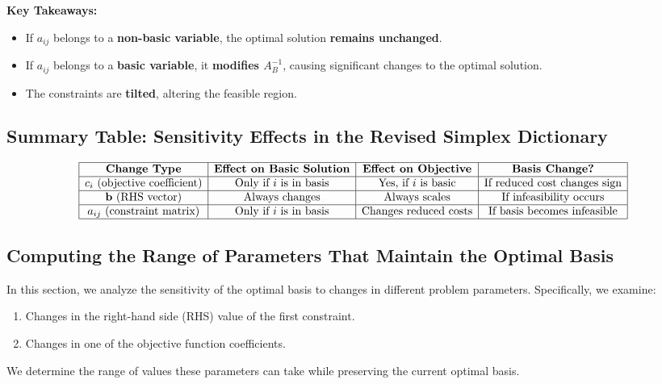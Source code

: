 \textbf{Key Takeaways:}
\begin{itemize}
    \item If \( a_{ij} \) belongs to a \textbf{non-basic variable}, the optimal solution \textbf{remains unchanged}.
    \item If \( a_{ij} \) belongs to a \textbf{basic variable}, it \textbf{modifies \( A_B^{-1} \)}, causing significant changes to the optimal solution.
    \item The constraints are \textbf{tilted}, altering the feasible region.
\end{itemize}

\subsection{Summary Table: Sensitivity Effects in the Revised Simplex Dictionary}

\[
\begin{array}{|c|c|c|c|}
\hline
\textbf{Change Type} & \textbf{Effect on Basic Solution} & \textbf{Effect on Objective} & \textbf{Basis Change?} \\
\hline
c_i \text{ (objective coefficient)} & \text{Only if \( i \) is in basis} & \text{Yes, if \( i \) is basic} & \text{If reduced cost changes sign} \\
\hline
\mathbf{b} \text{ (RHS vector)} & \text{Always changes} & \text{Always scales} & \text{If infeasibility occurs} \\
\hline
a_{ij} \text{ (constraint matrix)} & \text{Only if \( i \) is in basis} & \text{Changes reduced costs} & \text{If basis becomes infeasible} \\
\hline
\end{array}
\]

\subsection{Computing the Range of Parameters That Maintain the Optimal Basis}

In this section, we analyze the sensitivity of the optimal basis to changes in different problem parameters. Specifically, we examine:
\begin{enumerate}
    \item Changes in the right-hand side (RHS) value of the first constraint.
    \item Changes in one of the objective function coefficients.
\end{enumerate}
We determine the range of values these parameters can take while preserving the current optimal basis.


